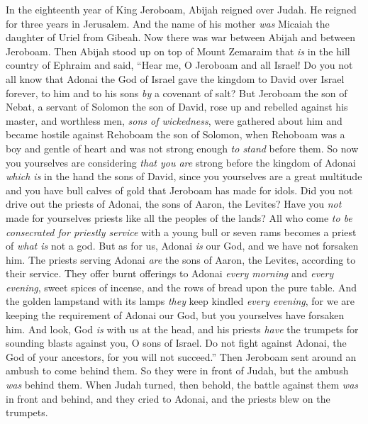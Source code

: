 \begin{biblechapter} %
 In the eighteenth year of King Jeroboam, Abijah reigned over Judah.
\verse He reigned for three years in Jerusalem. And the name of his mother \textit{was} Micaiah the daughter of Uriel from Gibeah.
\verse Now there was war between Abijah and between Jeroboam.
\verse Then Abijah stood up on top of Mount Zemaraim that \textit{is} in the hill country of Ephraim and said, “Hear me, O Jeroboam and all Israel!
\verse Do you not all know that Adonai the God of Israel gave the kingdom to David over Israel forever, to him and to his sons \textit{by} a covenant of salt?
\verse But Jeroboam the son of Nebat, a servant of Solomon the son of David, rose up and rebelled against his master,
\verse and worthless men, \textit{sons of wickedness}, were gathered about him and became hostile against Rehoboam the son of Solomon, when Rehoboam was a boy and gentle of heart and was not strong enough \textit{to stand} before them.
\verse So now you yourselves are considering \textit{that you are} strong before the kingdom of Adonai \textit{which is} in the hand the sons of David, since you yourselves are a great multitude and you have bull calves of gold that Jeroboam has made for idols.
\verse Did you not drive out the priests of Adonai, the sons of Aaron, the Levites? Have you \textit{not} made for yourselves priests like all the peoples of the lands? All who come \textit{to be consecrated for priestly service} with a young bull or seven rams becomes a priest of \textit{what is} not a god.
\verse But as for us, Adonai \textit{is} our God, and we have not forsaken him. The priests serving Adonai \textit{are} the sons of Aaron, the Levites, according to their service.
\verse They offer burnt offerings to Adonai \textit{every morning} and \textit{every evening}, sweet spices of incense, and the rows of bread upon the pure table. And the golden lampstand with its lamps \textit{they} keep kindled \textit{every evening}, for we are keeping the requirement of Adonai our God, but you yourselves have forsaken him.
\verse And look, God \textit{is} with us at the head, and his priests \textit{have} the trumpets for sounding blasts against you, O sons of Israel. Do not fight against Adonai, the God of your ancestors, for you will not succeed.”
\verse Then Jeroboam sent around an ambush to come behind them. So they were in front of Judah, but the ambush \textit{was} behind them.
\verse When Judah turned, then behold, the battle against them \textit{was} in front and behind, and they cried to Adonai, and the priests blew on the trumpets.

\end{biblechapter}
